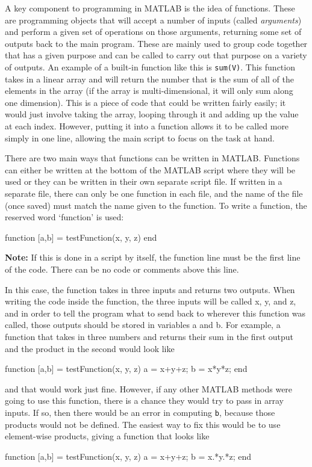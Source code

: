 A key component to programming in MATLAB is the idea of functions. These are programming objects that will accept a number of inputs (called \emph{arguments}) and perform a given set of operations on those arguments, returning some set of outputs back to the main program. These are mainly used to group code together that has a given purpose and can be called to carry out that purpose on a variety of outputs. An example of a built-in function like this is \texttt{sum(V)}. This function takes in a linear array and will return the number that is the sum of all of the elements in the array (if the array is multi-dimensional, it will only sum along one dimension). This is a piece of code that could be written fairly easily; it would just involve taking the array, looping through it and adding up the value at each index. However, putting it into a function allows it to be called more simply in one line, allowing the main script to focus on the task at hand. 

There are two main ways that functions can be written in MATLAB. Functions can either be written at the bottom of the MATLAB script where they will be used or they can be written in their own separate script file. If written in a separate file, there can only be one function in each file, and the name of the file (once saved) must match the name given to the function. To write a function, the reserved word `function' is used:
\begin{matlab}
function [a,b] = testFunction(x, y, z)
end
\end{matlab}

\textbf{Note:} If this is done in a script by itself, the function line must be the first line of the code. There can be no code or comments above this line.

In this case, the function takes in three inputs and returns two outputs. When writing the code inside the function, the three inputs will be called x, y, and z, and in order to tell the program what to send back to wherever this function was called, those outputs should be stored in variables a and b. For example, a function that takes in three numbers and returns their sum in the first output and the product in the second would look like
\begin{matlab}
function [a,b] = testFunction(x, y, z)
    a = x+y+z;
    b = x*y*z;
end
\end{matlab}
and that would work just fine. However, if any other MATLAB methods were going to use this function, there is a chance they would try to pass in array inputs. If so, then there would be an error in computing \texttt{b}, because those products would not be defined. The easiest way to fix this would be to use element-wise products, giving a function that looks like  
\begin{matlab}
function [a,b] = testFunction(x, y, z)
    a = x+y+z;
    b = x.*y.*z;
end
\end{matlab}


